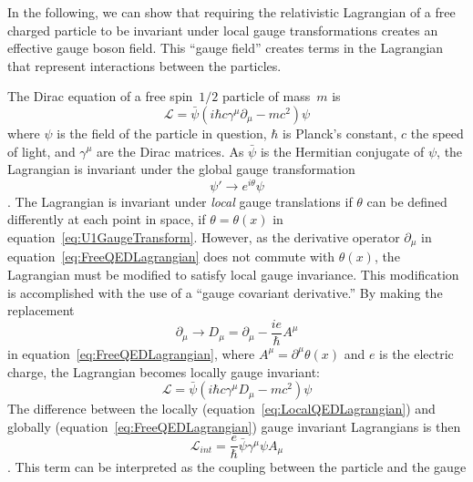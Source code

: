 In the following, we can show that requiring the relativistic Lagrangian of a
free charged particle to be invariant under local gauge transformations creates
an effective gauge boson field.  This ``gauge field'' creates terms in the
Lagrangian that represent interactions between the particles.

The Dirac equation  of a free spin~$1/2$ particle of mass~$m$
is
\begin{equation}
  \mathcal{L} = \bar \psi (i\hbar c\gamma^\mu \partial_\mu - mc^2) \psi 
  \label{eq:FreeQEDLagrangian}
\end{equation}
where $\psi$ is the field of the particle in question, $\hbar$ is Planck's
constant, $c$ the speed of light, and $\gamma^\mu$ are the Dirac matrices.  As
$\bar\psi$ is the Hermitian conjugate of $\psi$, the Lagrangian is invariant
under the global gauge transformation 
\begin{equation}
  \psi' \to e^{i\theta}\psi
  \label{eq:U1GaugeTransform}
\end{equation}.
The Lagrangian is invariant under \emph{local} gauge translations if $\theta$
can be defined differently at each point in space, \ie if $\theta = \theta(x)$
in equation~\ref{eq:U1GaugeTransform}.  However, as the derivative operator
$\partial_\mu$ in equation~\ref{eq:FreeQEDLagrangian} does not commute with
$\theta(x)$, the Lagrangian must be modified to satisfy local gauge invariance.
This modification is accomplished with the use of a ``gauge covariant
derivative.''  By making the replacement 
\begin{equation} 
  \partial_\mu \to D_\mu = \partial_\mu - \frac{ie}{\hbar}A^\mu      
\end{equation}
in equation~\ref{eq:FreeQEDLagrangian}, where 
$A^\mu = \partial^\mu \theta(x)$ and $e$ is the electric charge, the Lagrangian
becomes locally gauge invariant:
\begin{equation}
  \mathcal{L} = \bar \psi (i\hbar c\gamma^\mu D_\mu - mc^2) \psi 
  \label{eq:LocalQEDLagrangian}
\end{equation}
The difference between
the locally (equation~\ref{eq:LocalQEDLagrangian}) and globally 
(equation~\ref{eq:FreeQEDLagrangian}) gauge invariant Lagrangians is then
\begin{equation}
  \mathcal{L}_{int} = \frac{e}{\hbar}\bar\psi\gamma^\mu\psi A_\mu 
\end{equation}.
This term can be interpreted as the coupling between the particle and the gauge

